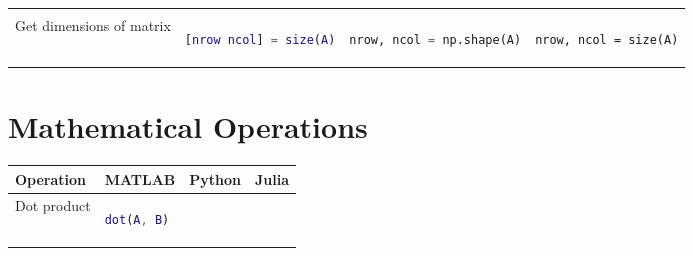 \documentclass[10pt, landscape]{article}
\begin{document}
\begin{multicols}{2}
\begin{tabular}[]{@{}llll@{}}
\begin{minipage}[t]{0.20\columnwidth}
\end{minipage}\tabularnewline
\begin{minipage}[t]{0.23\columnwidth}\raggedright
Get dimensions of matrix
\end{minipage} & \begin{minipage}[t]{0.23\columnwidth}\raggedright
\begin{lstlisting}[language=Matlab]
[nrow ncol] = size(A)
\end{lstlisting}

\end{minipage} & \begin{minipage}[t]{0.23\columnwidth}\raggedright
\begin{lstlisting}[language=Python]
nrow, ncol = np.shape(A)
\end{lstlisting}

\end{minipage} & \begin{minipage}[t]{0.20\columnwidth}\raggedright
\begin{lstlisting}
nrow, ncol = size(A)
\end{lstlisting}

\end{minipage}\tabularnewline
\bottomrule
\end{tabular}

\section{Mathematical Operations}\label{mathematical-operations}

\begin{tabular}[]{@{}llll@{}}
\toprule
\begin{minipage}[b]{0.23\columnwidth}\raggedright
Operation
\end{minipage} & \begin{minipage}[b]{0.22\columnwidth}\raggedright
MATLAB
\end{minipage} & \begin{minipage}[b]{0.23\columnwidth}\raggedright
Python
\end{minipage} & \begin{minipage}[b]{0.20\columnwidth}\raggedright
Julia
\end{minipage}\tabularnewline
\midrule
\begin{minipage}[t]{0.23\columnwidth}\raggedright
Dot product
\end{minipage} & \begin{minipage}[t]{0.22\columnwidth}\raggedright
\begin{lstlisting}[language=Matlab]
dot(A, B)
\end{lstlisting}


\end{minipage}
\end{tabular}
\end{multicols}
\end{document}
